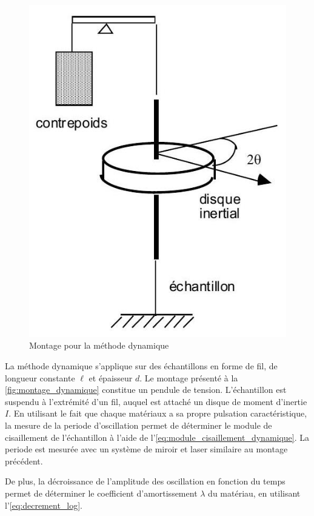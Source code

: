 \begin{figure}
    \centering
    \includegraphics[width=\linewidth]{figures/dynamique.png}
    \caption{Montage pour la méthode dynamique \cite{notice}}
    \label{fig:montage_dynamique}
\end{figure}
La méthode dynamique s'applique sur des échantillons en forme de fil, de longueur constante $\ell$ et épaisseur $d$. Le montage présenté à la \autoref{fig:montage_dynamique} constitue un pendule de tension. L'échantillon est suspendu à l'extrémité d'un fil, auquel est attaché un disque de moment d'inertie $I$. En utilisant le fait que chaque matériaux a sa propre pulsation caractéristique, la mesure de la periode d'oscillation permet de déterminer le module de cisaillement de l'échantillon à l'aide de l'\autoref{eq:module_cisaillement_dynamique}. La periode est mesurée avec un système de miroir et laser similaire au montage précédent.

De plus, la décroissance de l'amplitude des oscillation en fonction du temps permet de déterminer le coefficient d'amortissement $\lambda$ du matériau, en utilisant l'\autoref{eq:decrement_log}.

